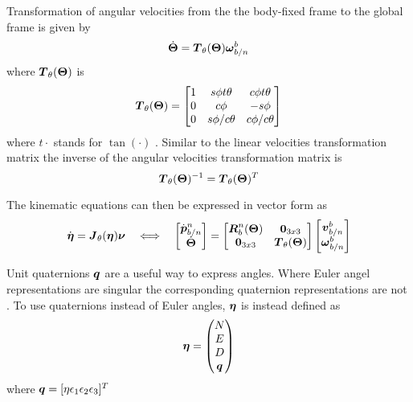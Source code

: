 Transformation of angular velocities from the the body-fixed frame to the global frame is given by 
\begin{equation}\label{eq:eulerAnglesdot}
\dot{\boldsymbol{\Theta}} = \boldsymbol{T}_{\theta}(\boldsymbol{\Theta})\boldsymbol{\omega}^b_{b/n}
\end{equation}
where $\boldsymbol{T}_{\theta}(\boldsymbol{\Theta})$ is 
\begin{equation}
\boldsymbol{T}_{\theta}(\boldsymbol{\Theta}) = \begin{bmatrix}
1 & s\phi t\theta & c\phi t\theta \\
0 & c\phi & -s\phi \\
0 & s\phi/c\theta & c\phi/c\theta
\end{bmatrix}
\end{equation}
where $t\cdot$ stands for $\tan(\cdot)$ \citep[p. 24-25]{fossen2011}. Similar to the linear velocities transformation matrix the inverse of the angular velocities transformation matrix is
\begin{equation}
\boldsymbol{T}_{\theta}(\boldsymbol{\Theta})^{-1} = \boldsymbol{T}_{\theta}(\boldsymbol{\Theta})^T
\end{equation}

The kinematic equations can then be expressed in vector form as 
\begin{equation} \label{eq:kinematicsticsEuler}
\dot{\boldsymbol{\eta}} = \boldsymbol{J}_\theta(\boldsymbol{\eta})\boldsymbol{\nu}
\quad\Longleftrightarrow\quad
\begin{bmatrix}
\dot{\boldsymbol{p}}^n_{b/n} \\
\dot{\boldsymbol{\Theta}}
\end{bmatrix}
=
\begin{bmatrix}
\boldsymbol{R}^n_b(\boldsymbol{\Theta}) & \boldsymbol{0}_{3x3} \\
\boldsymbol{0}_{3x3} & \boldsymbol{T}_\theta(\boldsymbol{\Theta})
\end{bmatrix}
\begin{bmatrix}
\boldsymbol{v}^b_{b/n} \\
\boldsymbol{\omega}^b_{b/n}
\end{bmatrix}
\end{equation}



 
Unit quaternions $\boldsymbol{q}$ are a useful way to express angles. Where Euler angel representations are singular the corresponding quaternion representations are not \citep{sensorfusion}. To use quaternions instead of Euler angles, $\boldsymbol{\eta}$ is instead defined as
\begin{equation}
\boldsymbol{\eta} = \begin{pmatrix}
N \\
E \\
D \\
\boldsymbol{q}
\end{pmatrix}
\end{equation} where $\boldsymbol{q} =[\eta \epsilon_1 \epsilon_2 \epsilon_3]^T$

